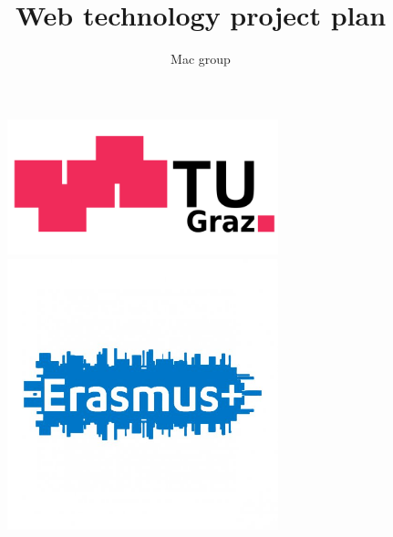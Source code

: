 \documentclass[12pt]{article}
\begin{document}
    \begin{titlepage}
        \title{Web technology project plan}
        \author{Mac group}

        \begin{figure}
            \begin{minipage}[c]{0.40\linewidth}
                \includegraphics[width=0.7\textwidth]{./Pictures/TUGraz.png}
            \end{minipage}
            \hfill
            \begin{minipage}[c]{0.48\linewidth}
                \hfill
                \includegraphics[width=0.7\textwidth]{./Pictures/Erasmus.jpeg}
            \end{minipage}
        \end{figure}


\end{titlepage}
\end{document}
